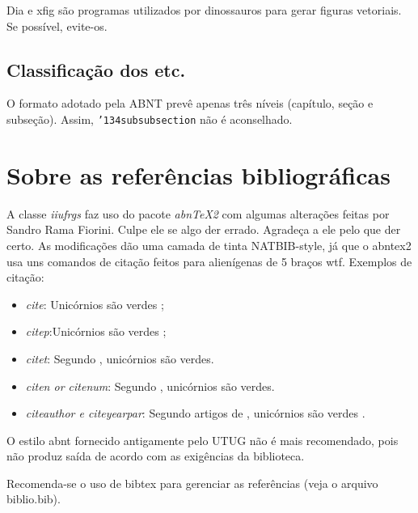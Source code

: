 \documentclass[ecp,tc,english]{iiufrgs}
\begin{document}
Dia e xfig são programas utilizados por dinossauros para gerar figuras vetoriais. Se possível, evite-os.

\subsection{Classificação dos etc.}

O formato adotado pela ABNT prevê apenas três níveis (capítulo, seção e subseção). Assim, \texttt{\char'134subsubsection} não é aconselhado.

\section{Sobre as referências bibliográficas}

A classe \emph{iiufrgs} faz uso do pacote \emph{abnTeX2} com algumas alterações
feitas por Sandro Rama Fiorini. Culpe ele se algo der errado. Agradeça a ele
pelo que der certo. As modificações dão uma camada de tinta NATBIB-style,
já que o abntex2 usa uns comandos de citação feitos para alienígenas de 5 braços 
wtf. Exemplos de citação:

\begin{itemize}
    \item \emph{cite}: Unicórnios são verdes \cite{Adams2009Conceptual};
    \item \emph{citep}:Unicórnios são verdes \citep{Adams2009Conceptual};
    \item \emph{citet}: Segundo \citet{Adams2009Conceptual}, unicórnios são
                        verdes.
    \item \emph{citen or citenum}: Segundo ,
        unicórnios são verdes.
    \item \emph{citeauthor e citeyearpar}: Segundo artigos de
        \citeauthor{Adams2009Conceptual} , unicórnios são verdes 
        \citeyearpar{Adams2009Conceptual}.

\end{itemize}

O estilo abnt fornecido antigamente pelo UTUG não é mais recomendado, pois não
produz saída de acordo com as exigências da biblioteca.

Recomenda-se o uso de bibtex para gerenciar as referências (veja o arquivo
biblio.bib).
\end{document}
